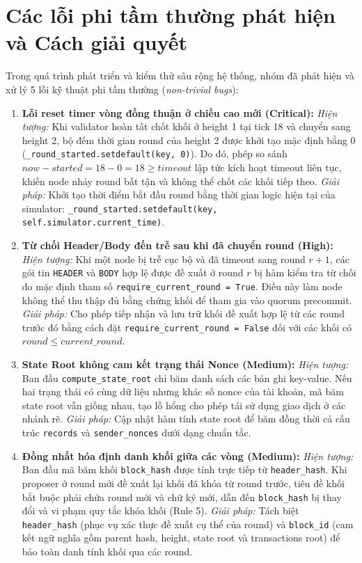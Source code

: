 \documentclass[10pt,a4paper]{report}
\begin{document}
\section{Các lỗi phi tầm thường phát hiện và Cách giải quyết}
Trong quá trình phát triển và kiểm thử sâu rộng hệ thống, nhóm đã phát hiện và xử lý 5 lỗi kỹ thuật phi tầm thường (\emph{non-trivial bugs}):
\begin{enumerate}
  \item \textbf{Lỗi reset timer vòng đồng thuận ở chiều cao mới (Critical):}
  \emph{Hiện tượng:} Khi validator hoàn tất chốt khối ở height 1 tại tick 18 và chuyển sang height 2, bộ đếm thời gian round của height 2 được khởi tạo mặc định bằng 0 (\texttt{\_round\_started.setdefault(key, 0)}). Do đó, phép so sánh $now - started = 18 - 0 = 18 \ge timeout$ lập tức kích hoạt timeout liên tục, khiến node nhảy round bất tận và không thể chốt các khối tiếp theo.
  \emph{Giải pháp:} Khởi tạo thời điểm bắt đầu round bằng thời gian logic hiện tại của simulator: \texttt{\_round\_started.setdefault(key, self.simulator.current\_time)}.

  \item \textbf{Từ chối Header/Body đến trễ sau khi đã chuyển round (High):}
  \emph{Hiện tượng:} Khi một node bị trễ cục bộ và đã timeout sang round $r + 1$, các gói tin \texttt{HEADER} và \texttt{BODY} hợp lệ được đề xuất ở round $r$ bị hàm kiểm tra từ chối do mặc định tham số \texttt{require\_current\_round = True}. Điều này làm node không thể thu thập đủ bằng chứng khối để tham gia vào quorum precommit.
  \emph{Giải pháp:} Cho phép tiếp nhận và lưu trữ khối đề xuất hợp lệ từ các round trước đó bằng cách đặt \texttt{require\_current\_round = False} đối với các khối có $round \le current\_round$.

  \item \textbf{State Root không cam kết trạng thái Nonce (Medium):}
  \emph{Hiện tượng:} Ban đầu \texttt{compute\_state\_root} chỉ băm danh sách các bản ghi key-value. Nếu hai trạng thái có cùng dữ liệu nhưng khác số nonce của tài khoản, mã băm state root vẫn giống nhau, tạo lỗ hổng cho phép tái sử dụng giao dịch ở các nhánh rẽ.
  \emph{Giải pháp:} Cập nhật hàm tính state root để băm đồng thời cả cấu trúc \texttt{records} và \texttt{sender\_nonces} dưới dạng chuẩn tắc.

  \item \textbf{Đồng nhất hóa định danh khối giữa các vòng (Medium):}
  \emph{Hiện tượng:} Ban đầu mã băm khối \texttt{block\_hash} được tính trực tiếp từ \texttt{header\_hash}. Khi proposer ở round mới đề xuất lại khối đã khóa từ round trước, tiêu đề khối bắt buộc phải chứa round mới và chữ ký mới, dẫn đến \texttt{block\_hash} bị thay đổi và vi phạm quy tắc khóa khối (Rule 5).
  \emph{Giải pháp:} Tách biệt \texttt{header\_hash} (phục vụ xác thực đề xuất cụ thể của round) và \texttt{block\_id} (cam kết ngữ nghĩa gồm parent hash, height, state root và transactions root) để bảo toàn danh tính khối qua các round.


\end{enumerate}
\end{document}
